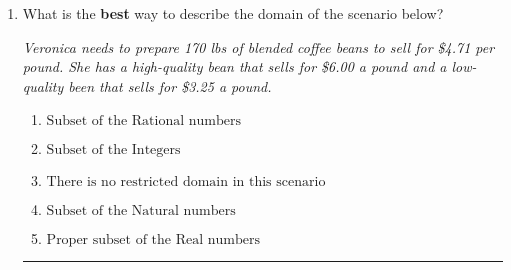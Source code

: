 \documentclass[14pt]{extbook}
\newcommand{\litem}[1]{\item#1\hspace*{-1cm}\rule{\textwidth}{0.4pt}}
\begin{document}
\begin{enumerate}
{\begin{enumerate}[label=\Alph*.]
\end{enumerate} }
\litem{
What is the \textbf{best} way to describe the domain of the scenario below?
\begin{center}
    \textit{ Veronica needs to prepare 170 lbs of blended coffee beans to sell for \$4.71 per pound. She has a high-quality bean that sells for \$6.00 a pound and a low-quality been that sells for \$3.25 a pound. }
\end{center}
\begin{enumerate}[label=\Alph*.]
\item \( \text{Subset of the Rational numbers} \)
\item \( \text{Subset of the Integers} \)
\item \( \text{There is no restricted domain in this scenario} \)
\item \( \text{Subset of the Natural numbers} \)
\item \( \text{Proper subset of the Real numbers} \)

\end{enumerate} }
\end{enumerate}
\end{document}
